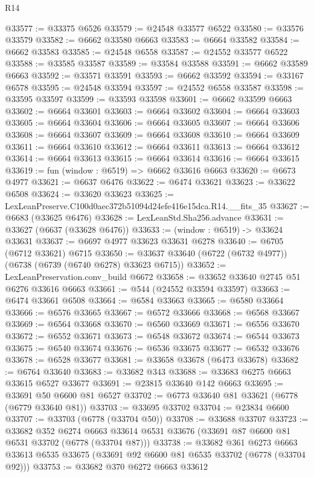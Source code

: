 \begin{lexlean}{R14}
\begin{coremodule}
@33577 := @33375 @6526
@33579 := @24548 @33577 @6522
@33580 := @33576 @33579
@33582 := @6662 @33580 @6663
@33583 := @6664 @33582
@33584 := @6662 @33583
@33585 := @24548 @6558
@33587 := @24552 @33577 @6522
@33588 := @33585 @33587
@33589 := @33584 @33588
@33591 := @6662 @33589 @6663
@33592 := @33571 @33591
@33593 := @6662 @33592
@33594 := @33167 @6578
@33595 := @24548 @33594
@33597 := @24552 @6558 @33587
@33598 := @33595 @33597
@33599 := @33593 @33598
@33601 := @6662 @33599 @6663
@33602 := @6664 @33601
@33603 := @6664 @33602
@33604 := @6664 @33603
@33605 := @6664 @33604
@33606 := @6664 @33605
@33607 := @6664 @33606
@33608 := @6664 @33607
@33609 := @6664 @33608
@33610 := @6664 @33609
@33611 := @6664 @33610
@33612 := @6664 @33611
@33613 := @6664 @33612
@33614 := @6664 @33613
@33615 := @6664 @33614
@33616 := @6664 @33615
@33619 := fun (window : @6519) => @6662 @33616 @6663
@33620 := @6673 @4977
@33621 := @6637 @6476
@33622 := @6474 @33621
@33623 := @33622 @6508
@33624 := @33620 @33623
@33625 := LexLeanPreserve.C100d0aec372b51094d24efe416e15dca.R14.__fits_35
@33627 := @6683 (@33625 @6476)
@33628 := LexLeanStd.Sha256.advance
@33631 := @33627 (@6637 (@33628 @6476))
@33633 := (window : @6519) -> @33624 @33631
@33637 := @6697 @4977 @33623 @33631 @6278
@33640 := @6705 (@6712 @33621) @6715
@33650 := @33637 @33640 (@6722 (@6732 @4977)) (@6738 (@6739 (@6740 @6278) @33623 @6715))
@33652 := LexLeanPreservation.conv_build @6672
@33658 := @33652 @33640 @2745 @51 @6276 @33616 @6663
@33661 := @544 (@24552 @33594 @33597)
@33663 := @6474 @33661 @6508
@33664 := @6584 @33663
@33665 := @6580 @33664
@33666 := @6576 @33665
@33667 := @6572 @33666
@33668 := @6568 @33667
@33669 := @6564 @33668
@33670 := @6560 @33669
@33671 := @6556 @33670
@33672 := @6552 @33671
@33673 := @6548 @33672
@33674 := @6544 @33673
@33675 := @6540 @33674
@33676 := @6536 @33675
@33677 := @6532 @33676
@33678 := @6528 @33677
@33681 := @33658 @33678 (@6473 @33678)
@33682 := @6764 @33640
@33683 := @33682 @343
@33688 := @33683 @6275 @6663 @33615 @6527 @33677
@33691 := @23815 @33640 @142 @6663
@33695 := @33691 @50 @6600 @81 @6527
@33702 := @6773 @33640 @81 @33621 (@6778 (@6779 @33640 @81))
@33703 := @33695 @33702
@33704 := @23834 @6600
@33707 := @33703 (@6778 (@33704 @50))
@33708 := @33688 @33707
@33723 := @33682
    @352
    @6274
    @6663
    @33614
    @6531
    @33676
    (@33691 @87 @6600 @81 @6531 @33702 (@6778 (@33704 @87)))
@33738 := @33682
    @361
    @6273
    @6663
    @33613
    @6535
    @33675
    (@33691 @92 @6600 @81 @6535 @33702 (@6778 (@33704 @92)))
@33753 := @33682
    @370
    @6272
    @6663
    @33612

\end{coremodule}
\end{lexlean}
